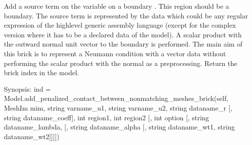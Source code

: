\documentclass[a4paper,11pt,english]{sphinxmanual}
\begin{document}
\begin{fulllineitems}

\begin{fulllineitems}
\label{\detokenize{python/cmdref_Model:getfem.Model.add_normal_source_term_brick}}
Add a source term on the variable  on a boundary .
This region should be a boundary. The source term is
represented by the data  which could be any regular
expression of the high\sphinxhyphen{}level generic assembly language (except
for the complex version where it has to be a declared data of
the model). A scalar
product with the outward normal unit vector to the boundary is performed.
The main aim of this brick is to represent a Neumann condition with a
vector data without performing the scalar product with the normal as a
pre\sphinxhyphen{}processing. Return the brick index in the model.

\end{fulllineitems}


\begin{fulllineitems}
\label{\detokenize{python/cmdref_Model:getfem.Model.add_penalized_contact_between_nonmatching_meshes_brick}}
Synopsis: ind = Model.add\_penalized\_contact\_between\_nonmatching\_meshes\_brick(self,  MeshIm mim, string varname\_u1, string varname\_u2, string dataname\_r {[}, string dataname\_coeff{]}, int region1, int region2 {[}, int option {[}, string dataname\_lambda, {[}, string dataname\_alpha {[}, string dataname\_wt1, string dataname\_wt2{]}{]}{]}{]})


\end{fulllineitems}
\end{fulllineitems}
\end{document}
